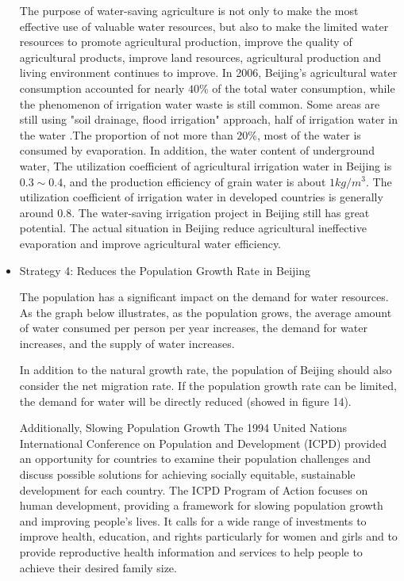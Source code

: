\documentclass{mcmthesis}
\begin{document}
\begin{itemize}
	\par The purpose of water-saving agriculture is not only to make the most effective use of valuable water resources, but also to make the limited water resources to promote agricultural production, improve the quality of agricultural products, improve land resources, agricultural production and living environment continues to improve. In 2006, Beijing's agricultural water consumption accounted for nearly $40\%$ of the total water consumption, while the phenomenon of irrigation water waste is still common. Some areas are still  using "soil drainage, flood irrigation" approach, half of irrigation water in the water .The proportion of not more than $20\%$, most of the water is consumed by evaporation. In addition, the water content of underground water, The utilization coefficient of agricultural irrigation water in Beijing is $0.3 \sim 0.4$, and the production efficiency of grain water is about $1 kg/m^3$. The utilization coefficient of irrigation water in developed countries is generally around 0.8. The water-saving irrigation project in Beijing still has great potential. The actual situation in Beijing reduce agricultural ineffective evaporation and improve agricultural water efficiency.
	\item Strategy 4: Reduces the Population Growth Rate in Beijing
	
	\par The population has a significant impact on the demand for water resources. As the graph below illustrates, as the population grows, the average amount of water consumed per person per year increases, the demand for water increases, and the supply of water increases.
	
 	\par In addition to the natural growth rate, the population of Beijing should also consider the net migration rate. If the population growth rate can be limited, the demand for water will be directly reduced (showed in figure 14).
	
	\par Additionally, Slowing Population Growth The 1994 United Nations International Conference on Population and Development (ICPD) provided an opportunity for countries to examine their population challenges and discuss possible solutions for achieving socially equitable, sustainable development for each country. The ICPD Program of Action focuses on human development, providing a framework for slowing population growth and improving people's lives. It calls for a wide range of investments to improve health, education, and rights particularly for women and girls and to provide reproductive health information and services to help people to achieve their desired family size. 
	

\end{itemize}
\end{document}
